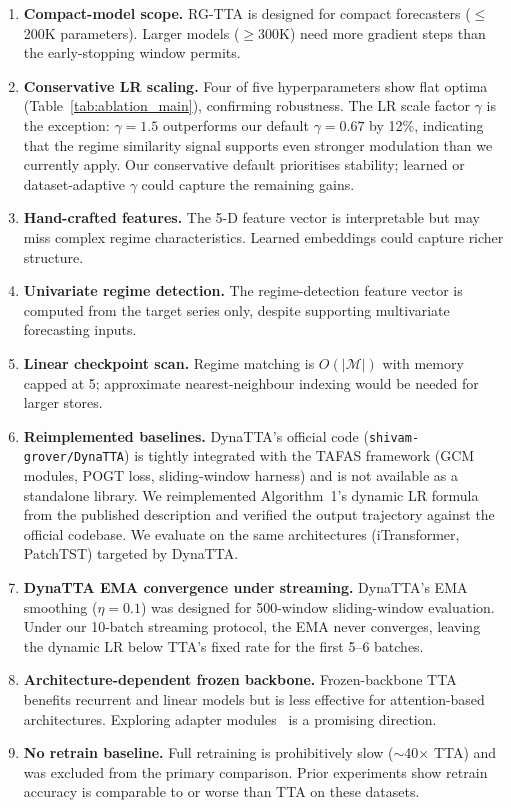 \documentclass[11pt,a4paper]{article}
\begin{document}
\begin{enumerate}[nosep]
  \item \textbf{Compact-model scope.} RG-TTA is designed for compact forecasters ($\leq$200K parameters). Larger models ($\geq$300K) need more gradient steps than the early-stopping window permits.
  \item \textbf{Conservative LR scaling.} Four of five hyperparameters show flat optima (Table~\ref{tab:ablation_main}), confirming robustness. The LR scale factor $\gamma$ is the exception: $\gamma=1.5$ outperforms our default $\gamma=0.67$ by 12\%, indicating that the regime similarity signal supports even stronger modulation than we currently apply. Our conservative default prioritises stability; learned or dataset-adaptive $\gamma$ could capture the remaining gains.
  \item \textbf{Hand-crafted features.} The 5-D feature vector is interpretable but may miss complex regime characteristics. Learned embeddings could capture richer structure.
  \item \textbf{Univariate regime detection.} The regime-detection feature vector is computed from the target series only, despite supporting multivariate forecasting inputs.
  \item \textbf{Linear checkpoint scan.} Regime matching is $O(|\mathcal{M}|)$ with memory capped at 5; approximate nearest-neighbour indexing would be needed for larger stores.
  \item \textbf{Reimplemented baselines.} DynaTTA's official code (\texttt{shivam-grover/DynaTTA}) is tightly integrated with the TAFAS framework (GCM modules, POGT loss, sliding-window harness) and is not available as a standalone library. We reimplemented Algorithm~1's dynamic LR formula from the published description and verified the output trajectory against the official codebase. We evaluate on the same architectures (iTransformer, PatchTST) targeted by DynaTTA.
  \item \textbf{DynaTTA EMA convergence under streaming.} DynaTTA's EMA smoothing ($\eta=0.1$) was designed for 500-window sliding-window evaluation. Under our 10-batch streaming protocol, the EMA never converges, leaving the dynamic LR below TTA's fixed rate for the first 5--6 batches.
  \item \textbf{Architecture-dependent frozen backbone.} Frozen-backbone TTA benefits recurrent and linear models but is less effective for attention-based architectures. Exploring adapter modules~\citep{houlsby2019adapters} is a promising direction.
  \item \textbf{No retrain baseline.} Full retraining is prohibitively slow ($\sim$40$\times$ TTA) and was excluded from the primary comparison. Prior experiments show retrain accuracy is comparable to or worse than TTA on these datasets.
\end{enumerate}
\end{document}
